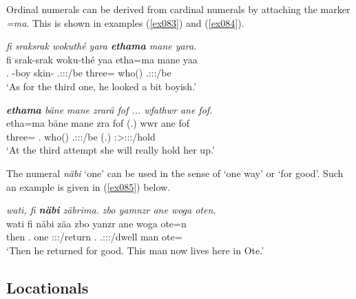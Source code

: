 Ordinal numerals can be derived from cardinal numerals by attaching the   marker \emph{=ma}. This is shown in examples (\ref{ex083}) and (\ref{ex084}).

\begin{exe}
	\ex \emph{fi sraksrak wokuthé yara \textbf{ethama} mane yara.}\\
	\gll fi srak-srak woku-thé yaa etha=ma mane yaa\\
	\Third.\Abs{} \Redup{}-boy skin-\Adlzr{} \Tsg.\Masc:\Sbj:\Pst:\Ipfv/be three=\Char{} who(\Abs) \Tsg.\Masc:\Sbj:\Pst:\Ipfv/be\\
	\trans `As for the third one, he looked a bit boyish.' 
	\label{ex083}
\end{exe}
\begin{exe}
	\ex \emph{\textbf{ethama} bäne mane zrarä fof ... wfathwr ane fof.}\\
	\gll etha=ma bäne mane zra fof (.) wwr ane fof\\
	three=\Char{} \Recog.\Abs{} who(\Abs) \Tsg{}.\F:\Sbj:\Irr{}:\Ipfv{}/be \Emph{} (.) \Stsg{}:\Sbj{}>\Tsg{}\F{}:\Obj{}:\Nonpast{}:\Ipfv/hold \Dem{} \Emph{}\\
	\trans `At the third attempt she will really hold her up.' 
	\label{ex084}
\end{exe}

The numeral \emph{näbi} `one' can be used in the sense of `one way' or `for good'. Such an example is given in (\ref{ex085}) below.

\begin{exe}
	\ex \emph{wati, fi \textbf{näbi} zäbrima. zbo yamnzr ane woga oten.}\\
	\gll wati fi näbi zäa zbo yanzr ane woga ote=n\\
	then \Third.\Abs{} one \Sg:\Sbj:\Pst:\Pfv/return \Prox{}.\All{} \Tsg{}.\Masc:\Sbj:\Nonpast:\Ipfv/dwell \Dem{} man ote=\Loc\\
	\trans `Then he returned for good. This man now lives here in Ote.'\\ 
	\label{ex085}
\end{exe}

\subsection{Locationals} \label{locationals}

